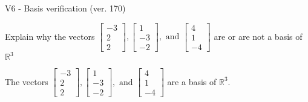 \begin{exercise}
  \begin{exerciseTitle}V6 - Basis verification (ver. 170)\end{exerciseTitle}
  \begin{exerciseStatement}
    Explain why the vectors \(\left[\begin{array}{r}
-3 \\
2 \\
2
\end{array}\right] , \left[\begin{array}{r}
1 \\
-3 \\
-2
\end{array}\right] , \text{ and } \left[\begin{array}{r}
4 \\
1 \\
-4
\end{array}\right]\) are or are not a basis of \(\mathbb{R}^3\)	


  \end{exerciseStatement}
  \begin{exerciseAnswer}
   The vectors \(\left[\begin{array}{r}
-3 \\
2 \\
2
\end{array}\right] , \left[\begin{array}{r}
1 \\
-3 \\
-2
\end{array}\right] , \text{ and } \left[\begin{array}{r}
4 \\
1 \\
-4
\end{array}\right]\) 
  	 are  a basis of \(\mathbb{R}^3\).
  


  \end{exerciseAnswer}
\end{exercise}